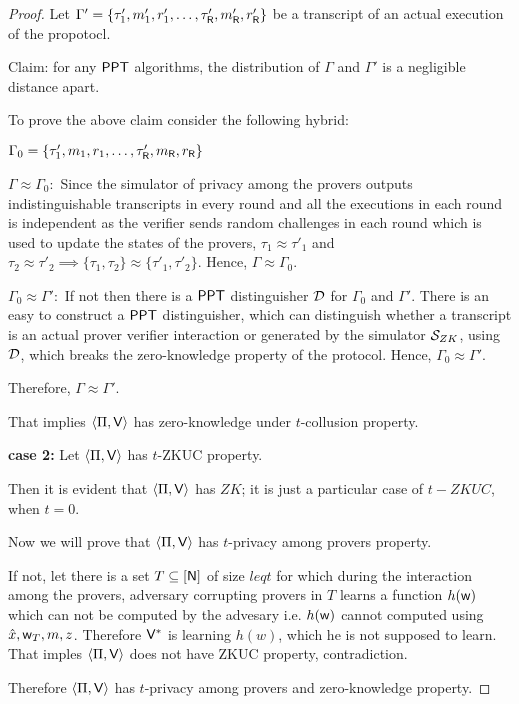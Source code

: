 \begin{proof}
	Let $\Gamma' = \{\tau'_1, m'_1 ,r'_1, \ldots, \tau'_{\mathsf{R}}, m'_{\mathsf{R}}, r'_{\mathsf{R}} \}$ be a transcript of an actual execution of the propotocl.
	
	Claim: for any $\mathsf{PPT}$ algorithms, the distribution of $\Gamma$ and $\Gamma'$ is a negligible distance apart.
	
	
	To prove the above claim consider the following hybrid: 
	
	$\Gamma_0 = \{\tau'_1, m_1 ,r_1, \ldots, \tau'_{\mathsf{R}}, m_{\mathsf{R}}, r_{\mathsf{R}} \}$
	
	$\Gamma \approx \Gamma_0 : $ Since the simulator of privacy among the provers outputs indistinguishable transcripts in every round and all the executions in each round is independent as the verifier sends random challenges in each round which is used to update the states of the provers, $\tau_1 \approx \tau'_1$ and $\tau_2 \approx \tau'_2 \implies \{\tau_1, \tau_2\} \approx \{\tau'_1, \tau'_2\}$. Hence, $\Gamma \approx \Gamma_0$.
	
	$\Gamma_0 \approx \Gamma': $ If not then there is a $\mathsf{PPT}$ distinguisher $\mathcal{D}$ for $\Gamma_0$ and $\Gamma'$. There is an easy to construct a $\mathsf{PPT}$ distinguisher, which can distinguish whether a transcript is an actual prover verifier interaction or generated by the simulator $\mathcal{S}_{ZK}$, using $\mathcal{D}$, which breaks the zero-knowledge property of the protocol. Hence, $\Gamma_0 \approx \Gamma'$.
	
	Therefore, $\Gamma \approx \Gamma'$.

That implies $\langle \Pi,\mathsf{V}\rangle$ has zero-knowledge under $t$-collusion property.

\textbf{case 2:} Let $\langle \Pi,\mathsf{V}\rangle$ has $t$-ZKUC property.

Then it is evident that $\langle \Pi,\mathsf{V}\rangle$ has $ZK$; it is just a particular case of $t-ZKUC$, when $t=0$.

Now we will prove that $\langle \Pi,\mathsf{V}\rangle$ has $t$-privacy among provers property. 

If not, let there is a set $T\subseteq [\mathsf{N}]$ of size $leq t$ for which during the interaction among the provers, adversary corrupting provers in $T$ learns a function $h(\mathsf{w})$ which can not be computed by the advesary i.e. $h(\mathsf{w})$ cannot computed using $\hat{x}, \mathsf{w}_T, m, z$. Therefore $\mathsf{V}^*$ is learning $h(w)$, which he is not supposed to learn. That imples $\langle \Pi,\mathsf{V}\rangle$ does not have ZKUC property, contradiction.

Therefore $\langle \Pi,\mathsf{V}\rangle$ has $t$-privacy among provers and zero-knowledge property.
\end{proof}


